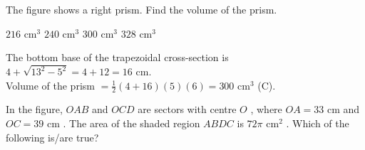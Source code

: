 

\question The figure shows a right prism. Find the volume of the prism.

\begin{minipage}{0.45\textwidth}
\begin{choices}
    \choice $216\text{ cm}^3$
    \choice $240\text{ cm}^3$
    \correctchoice $300\text{ cm}^3$
    \choice $328\text{ cm}^3$
\end{choices}
\end{minipage}
\begin{minipage}{0.52\textwidth}
\centering
{}
\end{minipage}
\begin{solution}
The bottom base of the trapezoidal cross-section is $4 + \sqrt{13^2 - 5^2} = 4 + 12 = 16\text{ cm}$. \\
Volume of the prism $= \frac{1}{2}(4 + 16)(5)(6) = 300\text{ cm}^3$ (C).
\end{solution}

\question In the figure, $OAB$ and $OCD$ are sectors with centre $O$ , where $OA = 33\text{ cm}$ and $OC = 39\text{ cm}$ . The area of the shaded region $ABDC$ is $72\pi\text{ cm}^2$ . Which of the following is/are true?

